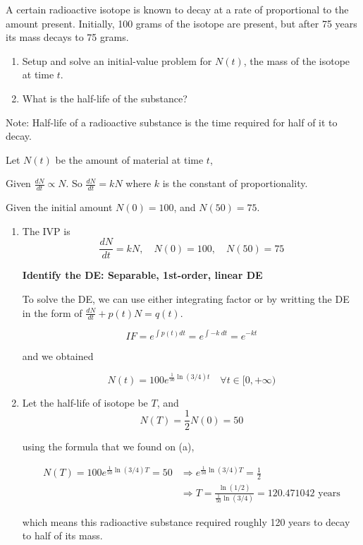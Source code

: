 \begin{example}
    A certain radioactive isotope is known to decay at a rate of proportional to the amount present.
    Initially, 100 grams of the isotope are present, but after 75 years its mass decays to 75 grams.

    \begin{enumerate}
        \item Setup and solve an initial-value problem for $N(t)$, the mass of the isotope at time $t$.
        \item What is the half-life of the substance?
    \end{enumerate}

    Note: Half-life of a radioactive substance is the time required for half of it to decay.
\end{example}
\begin{solution}
    Let $N(t)$ be the amount of material at time $t$,

    Given $\displaystyle \frac{dN}{dt} \propto N$. So $\displaystyle \frac{dN}{dt} = kN$ 
    where $k$ is the constant of proportionality. 
    
    Given the initial amount $N(0) = 100$, and $N(50) = 75$.

    \begin{enumerate}
        \item The IVP is 
            \[
                \frac{dN}{dt} = kN, \quad N(0) = 100, \quad N(50) = 75
            \]
        
            \textbf{Identify the DE: Separable, 1st-order, linear DE}

            To solve the DE, we can use either integrating factor or by writting 
            the DE in the form of $\frac{dN}{dt} + p(t)N = q(t)$.

            \[IF = e^{\int p(t) dt} = e^{\int -k \> dt} = e^{-kt}\]

            and we obtained 

            \[
                N(t) = 100 e^{\frac{1}{50} \ln(3/4)t} \quad \forall t \in [0, +\infty)
            \]
        
        \item Let the half-life of isotope be $T$, and 
            \[
                N(T) = \frac{1}{2} N(0) = 50
            \]

            using the formula that we found on (a), 

            \begin{align*}
                N(T) = 100 e^{\frac{1}{50} \ln(3/4)T} = 50 &\Rightarrow 
                e^{\frac{1}{50} \ln(3/4)T} = \frac{1}{2}\\
                &\Rightarrow T = \frac{\ln (1/2)}{\displaystyle \frac{1}{50} \ln (3/4)} = 120.471042 \text{ years}
            \end{align*}

            which means this radioactive substance required roughly 120 years to decay to half of its mass.
    \end{enumerate}
\end{solution}


